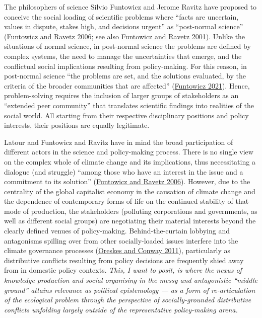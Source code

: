 \documentclass[a4paper, nobind]{templates/ociamthesis}
\begin{document}
The philosophers of science Silvio Funtowicz and Jerome Ravitz have proposed to conceive the social loading of scientific problems where ``facts are uncertain, values in dispute, stakes high, and decisions urgent'' as ``post-normal science'' (\protect\hyperlink{ref-funtowicz_post-normal_2006}{Funtowicz and Ravetz 2006}; see also \protect\hyperlink{ref-funtowicz_post-normal_2001}{Funtowicz and Ravetz 2001}). Unlike the situations of normal science, in post-normal science the problems are defined by complex systems, the need to manage the uncertainties that emerge, and the conflictual social implications resulting from policy-making. For this reason, in post-normal science ``the problems are set, and the solutions evaluated, by the criteria of the broader communities that are affected'' (\protect\hyperlink{ref-funtowicz_quick_2021}{Funtowicz 2021}). Hence, problem-solving requires the inclusion of larger groups of stakeholders as an ``extended peer community'' that translates scientific findings into realities of the social world. All starting from their respective disciplinary positions and policy interests, their positions are equally legitimate.

Latour and Funtowicz and Ravitz have in mind the broad participation of different actors in the science and policy-making process. There is no single view on the complex whole of climate change and its implications, thus necessitating a dialogue (and struggle) ``among those who have an interest in the issue and a commitment to its solution'' (\protect\hyperlink{ref-funtowicz_post-normal_2006}{Funtowicz and Ravetz 2006}). However, due to the centrality of the global capitalist economy in the causation of climate change and the dependence of contemporary forms of life on the continued stability of that mode of production, the stakeholders (polluting corporations and governments, as well as different social groups) are negotiating their material interests beyond the clearly defined venues of policy-making. Behind-the-curtain lobbying and antagonisms spilling over from other socially-loaded issues interfere into the climate governance processes (\protect\hyperlink{ref-oreskes_merchants_2011}{Oreskes and Conway 2011}), particularly as distributive conflicts resulting from policy decisions are frequently shied away from in domestic policy contexts. \emph{This, I want to posit, is where the nexus of knowledge production and social organising in the messy and antagonistic ``middle ground'' attains relevance as political epistemology --- as a form of re-articulation of the ecological problem through the perspective of socially-grounded distributive conflicts unfolding largely outside of the representative policy-making arena.}
\end{document}
